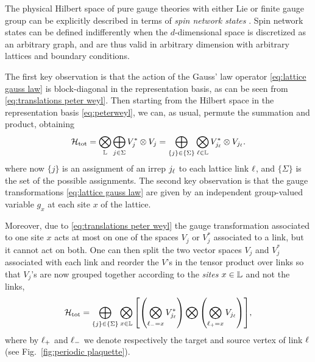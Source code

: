 The physical Hilbert space of pure gauge theories with either Lie or finite gauge group can be explicitly described in terms of \emph{spin network states} \cite{baez1996spinnetworks, burgio2000physical}.
Spin network states can be defined indifferently when the $d$-dimensional space is discretized as an arbitrary graph, and are thus valid in arbitrary dimension with arbitrary lattices and boundary conditions.

\medskip

The first key observation is that the action of the Gauss' law operator \eqref{eq:lattice gauss law} is block-diagonal in the representation basis, as can be seen from \eqref{eq:translations peter weyl}.
Then starting from the Hilbert space in the representation basis \eqref{eq:peterweyl}, we can, as usual, permute the summation and product, obtaining
\begin{equation}
    \label{eq:hilbert space permuted}
    \mathcal{H}_{\text{tot}} =
    \bigotimes_{\mathbb{L}} \bigoplus_{j \in \Sigma} V_j^* \otimes V_j =
    \bigoplus_{\{j\} \in \{\Sigma\}} \bigotimes_{\ell \in \mathbb{L}}  V_{j_{\ell}}^* \otimes V_{j_{\ell}}.
\end{equation}
where now $\{j\}$ is an assignment of an irrep $j_{\ell}$ to each lattice link $\ell$, and $\{\Sigma\}$ is the set of the possible assignments.
The second key observation is that the gauge transformations \eqref{eq:lattice gauss law} are given by an independent group-valued variable $g_x$ at each site $x$ of the lattice.

Moreover, due to \eqref{eq:translations peter weyl} the gauge transformation associated to one site $x$ acts at most on one of the spaces $V_j$ or $V_j^*$ associated to a link, but it cannot act on both.
One can then split the two vector spaces $V_j$ and $V_j^*$ associated with each link and reorder the $V$'s in the tensor product over links so that $V_j$'s are now grouped together according to the \emph{sites} $x \in \mathbb{L}$ and not the links,
\begin{equation}
    \HilbertTot =
    \bigoplus_{\{j\} \in \{\Sigma\}} \bigotimes_{x \in \Lattice}
    \bqty{
        \pqty{\bigotimes_{\link_{-}=x} V_{j_{\link}}^*} \bigotimes
        \pqty{\bigotimes_{\link_{+}=x} V_{j_{\link}} }
    },
    \label{eq:hilbert_space_site}
\end{equation}
where by $\ell_{+}$ and $\ell_{-}$ we denote respectively the target and source vertex of link $\ell$ (see Fig.~\ref{fig:periodic plaquette}).

\medskip


